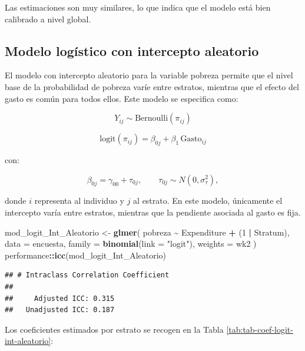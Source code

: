 \documentclass[
  spanish,
  12pt,
]{book}
\newenvironment{Shaded}{\begin{snugshade}}{\end{snugshade}}
\newcommand{\AttributeTok}[1]{\textcolor[rgb]{0.13,0.29,0.53}{#1}}
\newcommand{\DataTypeTok}[1]{\textcolor[rgb]{0.13,0.29,0.53}{#1}}
\newcommand{\DecValTok}[1]{\textcolor[rgb]{0.00,0.00,0.81}{#1}}
\newcommand{\FunctionTok}[1]{\textcolor[rgb]{0.13,0.29,0.53}{\textbf{#1}}}
\newcommand{\NormalTok}[1]{#1}
\newcommand{\OtherTok}[1]{\textcolor[rgb]{0.56,0.35,0.01}{#1}}
\newcommand{\SpecialCharTok}[1]{\textcolor[rgb]{0.81,0.36,0.00}{\textbf{#1}}}
\newcommand{\StringTok}[1]{\textcolor[rgb]{0.31,0.60,0.02}{#1}}
\begin{document}
Las estimaciones son muy similares, lo que indica que el modelo está bien calibrado a nivel global.

\subsection{Modelo logístico con intercepto aleatorio}\label{modelo-loguxedstico-con-intercepto-aleatorio}

El modelo con intercepto aleatorio para la variable pobreza permite que el nivel base de la probabilidad de pobreza varíe entre estratos, mientras que el efecto del gasto es común para todos ellos. Este modelo se especifica como:

\[Y_{ij} \sim \text{Bernoulli}(\pi_{ij})\]

\[
\text{logit}(\pi_{ij}) = \beta_{0j} + \beta_1 \, \text{Gasto}_{ij}
\]

con:

\[
\beta_{0j} = \gamma_{00} + \tau_{0j}, 
\qquad \tau_{0j} \sim N(0,\sigma_\tau^2),
\]

donde \(i\) representa al individuo y \(j\) al estrato. En este modelo, únicamente el intercepto varía entre estratos, mientras que la pendiente asociada al gasto es fija.

\begin{Shaded}
\begin{Highlighting}[]
\NormalTok{mod\_logit\_Int\_Aleatorio }\OtherTok{\textless{}{-}} \FunctionTok{glmer}\NormalTok{(}
\NormalTok{  pobreza }\SpecialCharTok{\textasciitilde{}}\NormalTok{ Expenditure }\SpecialCharTok{+}\NormalTok{ (}\DecValTok{1} \SpecialCharTok{|}\NormalTok{ Stratum),}
  \AttributeTok{data    =}\NormalTok{ encuesta,}
  \AttributeTok{family  =} \FunctionTok{binomial}\NormalTok{(}\AttributeTok{link =} \StringTok{"logit"}\NormalTok{),}
  \AttributeTok{weights =}\NormalTok{ wk2}
\NormalTok{)}
\NormalTok{performance}\SpecialCharTok{::}\FunctionTok{icc}\NormalTok{(mod\_logit\_Int\_Aleatorio)}
\end{Highlighting}
\end{Shaded}

\begin{verbatim}
## # Intraclass Correlation Coefficient
## 
##     Adjusted ICC: 0.315
##   Unadjusted ICC: 0.187
\end{verbatim}

Los coeficientes estimados por estrato se recogen en la Tabla \ref{tab:tab-coef-logit-int-aleatorio}:

\begin{Shaded}
\end{Shaded}
\end{document}
